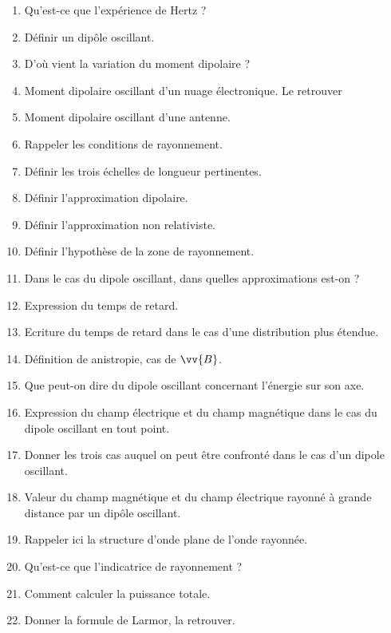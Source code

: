 \documentclass[a4paper, 11pt, hidelinks]{article}
\begin{document}
\begin{enumerate}
    \item Qu'est-ce que l'expérience de Hertz ? \cite{Chapitre18}
    \item Définir un dipôle oscillant. \cite{Chapitre18}
    \item D'où vient la variation du moment dipolaire ? \cite{Chapitre18}
    \item Moment dipolaire oscillant d'un nuage électronique. Le retrouver \cite{Chapitre18}
    \item Moment dipolaire oscillant d'une antenne. \cite{Chapitre18}
    \item Rappeler les conditions de rayonnement. \cite{Chapitre18}
    \item Définir les trois échelles de longueur pertinentes. \cite{Chapitre18}
    \item Définir l'approximation dipolaire. \cite{Chapitre18}
    \item Définir l'approximation non relativiste. \cite{Chapitre18}
    \item Définir l'hypothèse de la zone de rayonnement. \cite{Chapitre18}
    \item Dans le cas du dipole oscillant, dans quelles approximations est-on ? \cite{Chapitre18}
    \item Expression du temps de retard. \cite{Chapitre18}
    \item Ecriture du temps de retard dans le cas d'une distribution plus étendue. \cite{Chapitre18}
    \item Définition de anistropie, cas de $\vv{B}$. \cite{Chapitre18}
    \item Que peut-on dire du dipole oscillant concernant l'énergie sur son axe. \cite{Chapitre18}
    \item Expression du champ électrique et du champ magnétique dans le cas du dipole oscillant en tout point. \cite{Chapitre18}
    \item Donner les trois cas auquel on peut être confronté dans le cas d'un dipole oscillant. \cite{Chapitre18}
    \item Valeur du champ magnétique et du champ électrique rayonné à grande distance par un dipôle oscillant. \cite{Chapitre18}
    \item Rappeler ici la structure d'onde plane de l'onde rayonnée. \cite{Chapitre18}
    \item Qu'est-ce que l'indicatrice de rayonnement ? \cite{Chapitre18}
    \item Comment calculer la puissance totale. \cite{Chapitre18}
    \item Donner la formule de Larmor, la retrouver. \cite{Chapitre18}

\end{enumerate}
\end{document}
